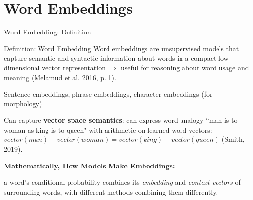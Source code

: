 
\section{Word Embeddings}




\begin{frame}{Word Embedding: Definition}
    
    {\linespread{0.2}
    \begin{definitionBlock}{Definition: Word Embedding}
        \small
        Word embeddings are unsupervised models that capture semantic and syntactic information about words in a compact low-dimensional vector representation $\Rightarrow$ useful for reasoning about word usage and meaning (Melamud et al. 2016, p. 1).
    \end{definitionBlock}}
    \vspace{-5pt}
    
    
    \begin{itemizeSpaced}{3pt}
        
%         
        
        
        \pinkbox Sentence embeddings, phrase embeddings, character embeddings (for morphology)
        
        \pinkbox Can capture \textbf{vector space semantics}: can express word analogy ``man is to woman as king is to queen" with arithmetic on learned word vectors: $vector(man) - vector(woman) = vector(king) - vector(queen)$ (Smith, 2019).
        
        \item \textbf{Mathematically, How Models Make Embeddings: }
        
        {\linespread{0.2}
        \begin{itemizeSpaced}{1pt}
            
            
            \arrowitem a word’s conditional probability combines its \emph{embedding} and \emph{context vectors} of surrounding words, with different methods combining them differently. 
            

\end{itemizeSpaced}}
\end{itemizeSpaced}
\end{frame}
